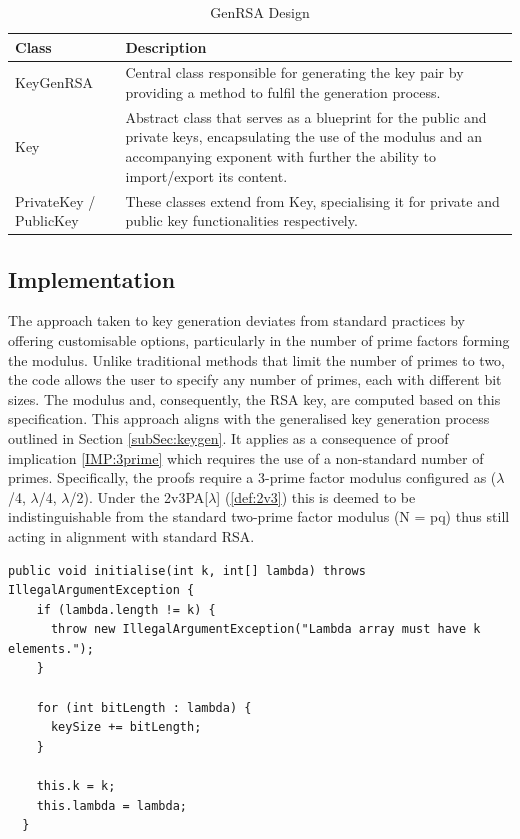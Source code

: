 \documentclass[]{final_report}
\theoremstyle{definition}
\begin{document}
\begin{table}[H]
    \centering
    \caption{GenRSA Design}
    \label{tab:actors_description}
    \begin{tabular}{|l|p{10cm}|}
    \hline
    \textbf{Class} & \textbf{Description} \\
    \hline
    KeyGenRSA & Central class responsible for generating the key pair by providing a method to fulfil the generation process. \\
    \hline
    Key & Abstract class that serves as a blueprint for the public and private keys, encapsulating the use of the modulus and an accompanying exponent with further the ability to import/export its content. \\
    \hline
    PrivateKey / PublicKey & These classes extend from Key, specialising it for private and public key functionalities respectively. \\
    \hline
    \end{tabular}
\end{table}



\subsection{Implementation}
The approach taken to key generation deviates from standard practices by offering customisable options, particularly in the number of prime factors forming the modulus. Unlike traditional methods that limit the number of primes to two, the code allows the user to specify any number of primes, each with different bit sizes. The modulus and, consequently, the RSA key, are computed based on this specification. This approach aligns with the generalised key generation process outlined in Section \ref{subSec:keygen}. It applies as a consequence of proof implication \ref{IMP:3prime} which requires the use of a non-standard number of primes.  Specifically, the proofs require a 3-prime factor modulus configured as ($\lambda$/4, $\lambda$/4, $\lambda$/2). Under the 2v3PA[$\lambda$] (\ref{def:2v3}) this is deemed to be indistinguishable from the standard two-prime factor modulus (N = pq) thus still acting in alignment with standard RSA.


\begin{lstlisting}[caption=Initialisation of parametrisable Key Generation]
public void initialise(int k, int[] lambda) throws IllegalArgumentException {
    if (lambda.length != k) {
      throw new IllegalArgumentException("Lambda array must have k elements.");
    }

    for (int bitLength : lambda) { 
      keySize += bitLength;
    }

    this.k = k;
    this.lambda = lambda;
  }
 \end{lstlisting}
 
\end{document}

